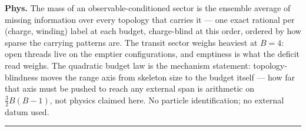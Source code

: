 \begin{theorem}
\textbf{Phys.} The mass of an observable-conditioned sector is the ensemble average of missing information over every topology that carries it — one exact rational per (charge, winding) label at each budget, charge-blind at this order, ordered by how sparse the carrying patterns are. The transit sector weighs heaviest at $B=4$: open threads live on the emptier configurations, and emptiness is what the deficit read weighs. The quadratic budget law is the mechanism statement: topology-blindness moves the range axis from skeleton size to the budget itself — how far that axis must be pushed to reach any external span is arithmetic on $\tfrac32B(B-1)$, not physics claimed here. No particle identification; no external datum used.

\vspace{2pt}\noindent\rule{\textwidth}{0.4pt}\vspace{2pt}

\end{theorem}

